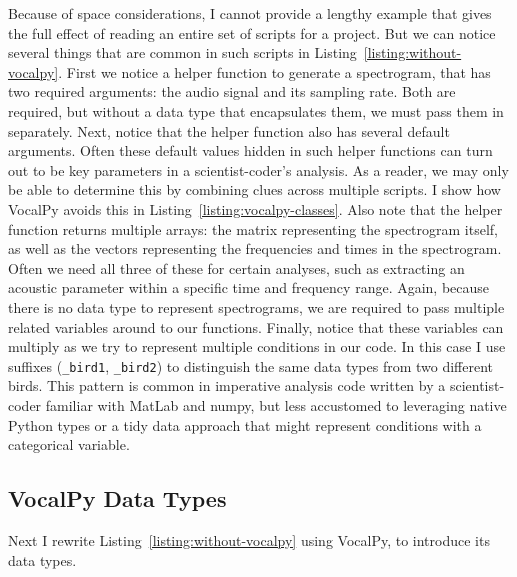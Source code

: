 \documentclass[11pt]{article}
\begin{document}
Because of space considerations, I cannot provide a lengthy example that gives the full effect of reading an entire set of scripts for a project. But we can notice several things that are common in such scripts in Listing~\ref{listing:without-vocalpy}.
First we notice a helper function to generate a spectrogram, that has two required  arguments: the audio signal and its sampling rate. Both are required, but without a data type that encapsulates them, we must pass them in separately. Next, notice that the helper function also has several default arguments. Often these default values hidden in such helper functions can turn out to be key parameters in a scientist-coder's analysis. As a reader, we may only be able to determine this by combining clues across multiple scripts. I show how VocalPy avoids this in Listing~\ref{listing:vocalpy-classes}. Also note that the helper function returns multiple arrays: the matrix representing the spectrogram itself, as well as the vectors representing the frequencies and times in the spectrogram. Often we need all three of these for certain analyses, such as extracting an acoustic parameter within a specific time and frequency range. Again, because there is no data type to represent spectrograms, we are required to pass multiple related variables around to our functions. Finally, notice that these variables can multiply as we try to represent multiple conditions in our code. In this case I use suffixes (\texttt{\_bird1}, \texttt{\_bird2}) to distinguish the same data types from two different birds. This pattern is common in imperative analysis code written by a scientist-coder familiar with MatLab and numpy, but less accustomed to leveraging native Python types or a tidy data approach that might represent conditions with a categorical variable.

\subsection{VocalPy Data Types}

Next I rewrite Listing~\ref{listing:without-vocalpy} using VocalPy, to introduce its data types.

\end{document}
